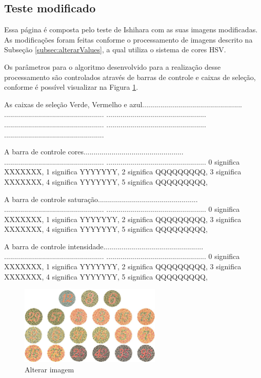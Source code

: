 \documentclass[	12pt, Times, openright, twoside, a4paper, english, brazil]{abntex2}
\begin{document}
\subsection{Teste modificado}

Essa página é composta pelo teste de Ishihara com as suas imagens modificadas. As modificações foram feitas conforme o processamento de imagens descrito na Subseção \ref{subsec:alterarValues}, a qual utiliza o sistema de cores HSV.

Os parâmetros para o algoritmo desenvolvido para a realização desse processamento são controlados através de barras de controle e caixas de seleção, conforme é possível visualizar na Figura \ref{fig:figuraParametrosTeste}.

As caixas de seleção Verde, Vermelho e azul.................................................. .................................................. .................................................. .................................................. .................................................. ..................................................

A barra de controle cores..................................................
..................................................
..................................................
0 significa XXXXXXX, 1 significa YYYYYYY, 2 significa QQQQQQQQQ,
3 significa XXXXXXX, 4 significa YYYYYYY, 5 significa QQQQQQQQQ,

A barra de controle saturação..................................................
..................................................
..................................................
0 significa XXXXXXX, 1 significa YYYYYYY, 2 significa QQQQQQQQQ,
3 significa XXXXXXX, 4 significa YYYYYYY, 5 significa QQQQQQQQQ,

A barra de controle intensidade..................................................
..................................................
..................................................
0 significa XXXXXXX, 1 significa YYYYYYY, 2 significa QQQQQQQQQ,
3 significa XXXXXXX, 4 significa YYYYYYY, 5 significa QQQQQQQQQ,

\begin{figure}[!htb]
\centering \includegraphics[width=0.6\textwidth]{pranchas.JPG}
\caption{Alterar imagem} \label{fig:figuraParametrosTeste}
\end{figure}
\end{document}
